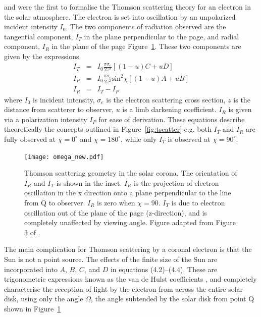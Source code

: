 \citet{schuster1879} and \citet{minnaert1930} were the first to formalise the Thomson scattering theory for an electron in the solar atmosphere. The electron is set into oscillation by an unpolarized  incident intensity $I_0$.
The two components of radiation observed are the tangential component, $I_T$ in the plane perpendicular to the page, and radial component, $I_R$ in the plane of the page Figure~\ref{fig:omega}. 
These two components are given by the expressions \citep{howtap2009}
\begin{eqnarray}
I_T &=& I_0\frac{\pi \sigma_e}{2z^2}[(1-u)C +uD] \\
I_P &=& I_0\frac{\pi \sigma_e}{2z^2}\mathrm{sin}^2\chi[(1-u)A +uB] \\
I_R &=& I_T-I_P
\end{eqnarray}
where $I_0$ is incident intensity, $\sigma_e$ is the electron scattering cross section, $z$ is the distance from scatterer to observer, $u$ is a limb darkening coefficient. $I_R$ is given via a polarization intensity $I_P$ for ease of derivation. These equations describe theoretically the concepts outlined in Figure~\ref{fig:tscatter} e.g, both $I_T$ and $I_R$ are fully observed at $\chi=0^{\circ}$ and $\chi=180^{\circ}$, while only $I_T$ is observed at $\chi=90^{\circ}$. 
\begin{figure}[!t]
\begin{center}
\texttt{[image: omega\_new.pdf]}
\caption[Thomson scattering geometry in the solar corona]{Thomson scattering geometry in the solar corona. The orientation of $I_R$ and $I_T$ is shown in the inset. $I_R$ is the projection of electron oscillation in the x direction onto a plane perpendicular to the line from Q to observer. $I_R$ is zero when $\chi=90$. $I_T$ is due to electron oscillation out of the plane of the page (z-direction), and is completely unaffected by viewing angle. Figure adapted from Figure 3 of \citep{howtap2009}.}
\label{fig:omega}
\end{center}
\end{figure}
The main complication for Thomson scattering by a coronal electron is that the Sun is not a point source. The effects of the finite size of the Sun are incorporated into $A$, $B$, $C$, and $D$ in equations (4.2)--(4.4). These are trigonometric expressions known as the van de Hulst coefficients \citep{vdeh50}, and completely characterise the reception of light by the electron from across the entire solar disk, using only the angle $\Omega$, the angle subtended by the solar disk from point Q shown in Figure~\ref{fig:omega} \citep{minnaert1930, billings1966, billings1966} 
